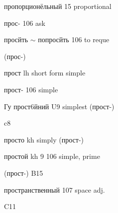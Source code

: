 \begin{minipage}[t]{0.475\textwidth}
\noindent пропорционёльный 15 proportional\par
\noindent прос- 106 ask\par
\noindent просйть $\sim$ попросйть 106 to reque\par
\noindent (прос-)\par
\noindent прост lh short form simple\par
\noindent прост- 106 simple\par
\noindent Гу прост6йний U9 simplest (прост-)\par
\noindent c8\par
\noindent просто kh simply (прост-)\par
\noindent простой kh 9 106 simple, prime\par
\noindent (прост-) B15\par
\noindent пространственный 107 space adj.\par
\noindent C11\par
\end{minipage}
\endgroup

